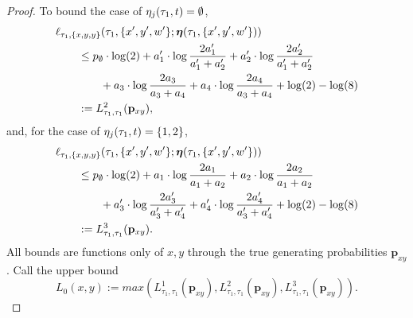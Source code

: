 \begin{proof}
To bound the case of $\eta_j(\tau_1, t) = \emptyset$,
\begin{align*}
&    \ell_{\tau_1,\{x,y,y\}}(\tau_1, \{x',y',w'\}; \boldsymbol\eta(\tau_1,\{x',y',w'\})) \\
&\qquad\le      p_{\emptyset}  \cdot\log(2)
+ a_{1}'\cdot\log\frac{2a_{1}'}{a_{1}'+a_{2}'}
+ a_{2}'\cdot\log\frac{2a_{2}'}{a_{1}'+a_{2}'} \\
&\qquad\qquad + a_{3}\cdot\log\frac{2a_{3}}{a_{3}+a_{4}}
+ a_{4}\cdot\log\frac{2a_{4}}{a_{3}+a_{4}}
+ \log(2)
- \log(8) \\
&\qquad := L^{2}_{\tau_1,\tau_1}(\mathbf{p}_{xy}),
\end{align*}
and, for the case of $\eta_j(\tau_1, t) = \{1,2\}$,
\begin{align*}
&    \ell_{\tau_1,\{x,y,y\}}(\tau_1, \{x',y',w'\}; \boldsymbol\eta(\tau_1,\{x',y',w'\})) \\
&\qquad\le      p_{\emptyset}  \cdot\log(2)
+ a_{1}\cdot\log\frac{2a_{1}}{a_{1}+a_{2}}
+ a_{2}\cdot\log\frac{2a_{2}}{a_{1}+a_{2}} \\
&\qquad\qquad+ a_{3}'\cdot\log\frac{2a_{3}'}{a_{3}'+a_{4}'}
+ a_{4}'\cdot\log\frac{2a_{4}'}{a_{3}'+a_{4}'}
+ \log(2)
- \log(8) \\
&\qquad := L^{3}_{\tau_1,\tau_1}(\mathbf{p}_{xy}).
\end{align*}
All bounds are functions only of $x,y$ through the true generating probabilities $\mathbf{p}_{xy}$.
Call the upper bound
$$
L_0(x, y) := max(L^{1}_{\tau_1,\tau_1}(\mathbf{p}_{xy}), L^{2}_{\tau_1,\tau_1}(\mathbf{p}_{xy}), L^{3}_{\tau_1,\tau_1}(\mathbf{p}_{xy})).
$$


\end{proof}
